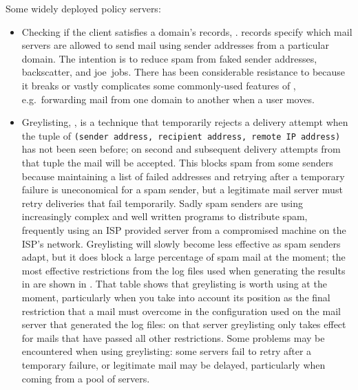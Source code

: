 Some widely deployed policy servers:

\begin{itemize}

    \item Checking if the client satisfies a domain's 
        records, .
         records specify which mail servers are allowed to
        send mail using sender addresses from a particular domain.  The
        intention is to reduce spam from faked sender addresses,
        backscatter, and joe~jobs.
        There has been considerable resistance to  because it
        breaks or vastly complicates some commonly-used features of
        , e.g.\ forwarding mail from one domain to another
        when a user moves.

    \item Greylisting,
        , is a
        technique that temporarily rejects a delivery attempt when the
        tuple of \newline{} \tab{}\texttt{(sender address, recipient
        address, remote IP address)}\newline{} has not been seen before; on
        second and subsequent delivery attempts from that tuple the mail
        will be accepted.  This blocks spam from some senders because
        maintaining a list of failed addresses and retrying after a
        temporary failure is uneconomical for a spam sender, but a
        legitimate mail server must retry deliveries that fail temporarily.
        Sadly spam senders are using increasingly complex and well written
        programs to distribute spam, frequently using an ISP provided
         server from a compromised machine on the ISP's
        network.  Greylisting will slowly become less effective as spam
        senders adapt, but it does block a large percentage of spam mail at
        the moment; the most effective restrictions from the
        \numberOFlogFILES{} log files used when generating the results in
         are shown in .  That table shows that greylisting is worth using at
        the moment, particularly when you take into account its position as
        the final restriction that a mail must overcome in the
        configuration used on the mail server that generated the log files:
        on that server greylisting only takes effect for mails that have
        passed all other restrictions.  Some problems may be encountered
        when using greylisting: some servers fail to retry after a
        temporary failure, or legitimate mail may be delayed, particularly
        when coming from a pool of servers.


\end{itemize}
